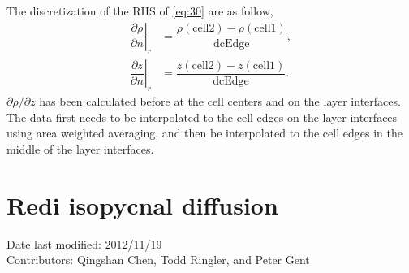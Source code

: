 \documentclass[12pt]{report}
\def\p{\partial}
\begin{document}
The discretization of the RHS of \eqref{eq:30} are as follow,
\begin{align*}
\left.\dfrac{\p\rho}{\p n}\right|_r &= 
\dfrac{\rho(\textrm{cell2}) - \rho(\textrm{cell1})}{\textrm{dcEdge}},\\
\left.\dfrac{\p z}{\p n}\right|_r &= 
\dfrac{z(\textrm{cell2}) - z(\textrm{cell1})}{\textrm{dcEdge}}.
\end{align*}
$\p\rho/\p z$ has been calculated before at the cell centers and on 
the layer interfaces. The data first needs to be interpolated to the cell 
edges on the layer interfaces using area weighted averaging, and then
be interpolated to the cell edges in the middle of the layer 
interfaces.


\section{Redi isopycnal diffusion}\label{sec:redi-isopycn-diff} 
Date last modified: 2012/11/19 \\
Contributors: Qingshan Chen, Todd Ringler, and Peter Gent\\
\end{document}
